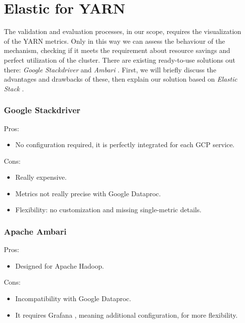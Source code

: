 \documentclass[12pt,twoside,cucitura]{toptesi}
\begin{document}
\section{Elastic for YARN}
The validation and evaluation processes, in our scope, requires the visualization of the YARN metrics. Only in this way we can assess the behaviour of the mechanism, checking if it meets the requirement about resource savings and perfect utilization of the cluster. There are existing ready-to-use solutions out there: \textit{Google Stackdriver} \cite{stackdriver} and \textit{Ambari} \cite{ambari}. First, we will briefly discuss the advantages and drawbacks of these, then explain our solution based on \textit{Elastic Stack} \cite{elastic}.

\subsubsection{Google Stackdriver}
Pros:
\begin{itemize}
  \item No configuration required, it is perfectly integrated for each GCP service.
\end{itemize}
Cons:
\begin{itemize}
  \item Really expensive.
  \item Metrics not really precise with Google Dataproc.
  \item Flexibility: no customization and missing single-metric details.
\end{itemize}

\subsubsection{Apache Ambari}
Pros:
\begin{itemize}
  \item Designed for Apache Hadoop.
\end{itemize}
Cons:
\begin{itemize}
  \item Incompatibility with Google Dataproc.
  \item It requires Grafana \cite{grafana}, meaning additional configuration, for more flexibility.
\end{itemize}
\end{document}

